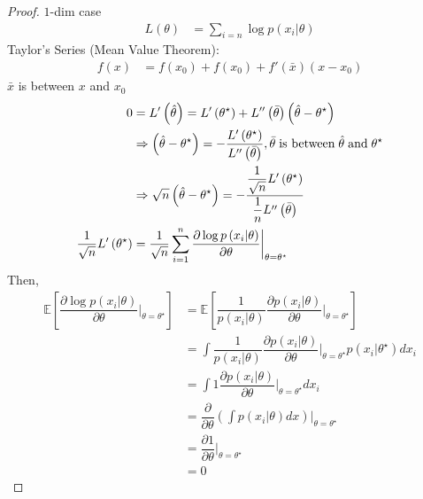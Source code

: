 \documentclass{article}
\begin{document}
\begin{proof} \label{proof:cltc} 
$1$-dim case
\begin{align*}
L\left(\theta\right)  &= \displaystyle\sum_{i=n} \log p\left(x_{i} | \theta\right)
\end{align*}
Taylor's Series (Mean Value Theorem):
\begin{align*}
f\left(x\right)  &= f\left(x_{0}\right) + f\left(x_{0}\right) + f'\left(\bar{x}\right)\left(x - x_{0}\right)
\end{align*}
$\bar{x}$ is between $x $ and $x_{0}$
\begin{align*}
0 &= L'\left(\hat{\theta}\right) = L'\left(\theta^\star \right) + L''\left(\bar{\theta}\right)\left(\hat{\theta} - \theta^\star \right)
\\ &\Rightarrow  \left(\hat{\theta} - \theta^\star \right) = - \dfrac{L'\left(\theta^\star \right)}{L''\left(\bar{\theta}\right)}, \bar{\theta} \text{\;is between\;} \hat{\theta} \text{\;and\;} \theta^\star 
\\ &\Rightarrow  \sqrt{n} \left(\hat{\theta} - \theta^\star \right) = - \dfrac{\dfrac{1}{\sqrt{n}} L'\left(\theta^\star \right)}{\dfrac{1}{n} L''\left(\bar{\theta}\right)}
\\ \dfrac{1}{\sqrt{n}} L'\left(\theta^\star \right) &= \dfrac{1}{\sqrt{n}} \displaystyle\sum_{i=1}^{n} \dfrac{\partial \log p\left(x_{i} | \theta\right)}{\partial \theta} \bigg|_{\theta = \theta^\star }
\end{align*}
Then,
\begin{align*}
\mathbb{E}\left[ \dfrac{\partial \log p\left(x_{i} | \theta\right)}{\partial \theta} \bigg|_{\theta = \theta^\star } \right] &= \mathbb{E} \left[ \dfrac{1}{p\left(x_{i} | \theta\right)} \dfrac{\partial p\left(x_{i} | \theta\right)}{\partial \theta} \bigg|_{\theta = \theta^\star }\right]
\\ &= \displaystyle\int \dfrac{1}{p\left(x_{i} | \theta\right)} \dfrac{\partial p\left(x_{i} | \theta\right)}{\partial \theta} \bigg|_{\theta = \theta^\star } p\left(x_{i} | \theta^\star \right) dx_{i}
\\ &= \displaystyle\int 1 \dfrac{\partial p\left(x_{i} | \theta\right)}{\partial \theta} \bigg|_{\theta = \theta^\star } dx_{i}
\\ &= \dfrac{\partial }{\partial \theta} \left(\displaystyle\int p\left(x_{i} | \theta\right) dx\right) \bigg|_{\theta = \theta^\star }
\\ &= \dfrac{\partial 1}{\partial \theta} \bigg|_{\theta = \theta^\star }
\\ &= 0

\end{align*}
\end{proof}
\end{document}
